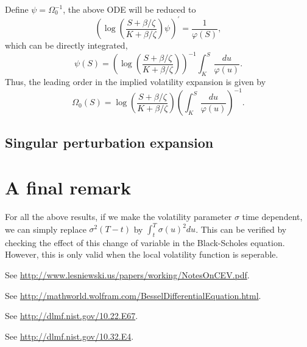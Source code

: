 \documentclass[12pt]{article}
\begin{document}
    Define $\psi=\Omega_0^{-1}$, the above ODE will be reduced to
    \begin{equation}
      \left(\log\left(\frac{S+\beta / \zeta}{K+\beta / \zeta}\right)\psi\right)^{\prime} = \frac{1}{\varphi(S)},
    \end{equation}
    which can be directly integrated,
    \begin{equation}
      \psi(S) = \left(\log\left(\frac{S+\beta / \zeta}{K+\beta / \zeta}\right)\right)^{-1}\int_K^S\frac{du}{\varphi(u)}.
    \end{equation}
    Thus, the leading order in the implied volatility expansion is given by
    \begin{equation}
      \Omega_0(S) = \log\left(\frac{S+\beta / \zeta}{K+\beta / \zeta}\right)\left(\int_K^S\frac{du}{\varphi(u)}\right)^{-1}.
    \end{equation}




  \subsection{Singular perturbation expansion}

\section{A final remark}

  For all the above results, if we make the volatility parameter $\sigma$ time dependent, we can simply replace $\sigma^2(T-t)$
  by $\int_t^T\sigma(u)^2du$. This can be verified by checking the effect of this change of variable in the Black-Scholes equation.
  However, this is only valid when the local volatility function is seperable.




\begin{thebibliography}{99}
    See \url{http://www.lesniewski.us/papers/working/NotesOnCEV.pdf}.

    See \url{http://mathworld.wolfram.com/BesselDifferentialEquation.html}.

    See \url{http://dlmf.nist.gov/10.22.E67}.

    See \url{http://dlmf.nist.gov/10.32.E4}.
\end{thebibliography}
\end{document}

